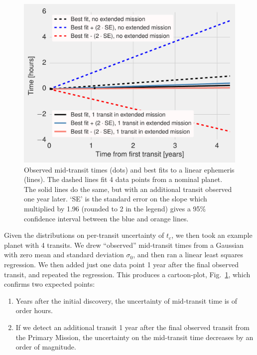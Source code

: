 \begin{figure}[!t]
	\centering
	\includegraphics[scale=1.]{figures/lowering_uncertainty_on_midtransit_via_extra_point.pdf}
	\caption{	Observed mid-transit times (dots) and best fits to a linear ephemeris (lines).
		The dashed lines fit 4 data points from a nominal planet.
		The solid lines do the same, but with an additional transit observed one year
		later.
		`SE' is the standard error on the slope which multiplied by 1.96 (rounded to 2 in the legend) gives a 95\% confidence interval between the blue and orange lines.
	}
	\label{fig:lowering_uncertainty_tc}
\end{figure}

Given the distributions on per-transit uncertainty of $t_c$, we then took an example planet with 4 transits.
We drew ``observed'' mid-transit times from a Gaussian with zero mean and standard deviation $\sigma_{0}$, and then ran a linear least squares regression. 
We then added just one data point 1 year after the final observed transit, and repeated the regression.
This produces a cartoon-plot, Fig.~\ref{fig:lowering_uncertainty_tc}, which confirms two expected points:
\begin{enumerate}
	\item Years after the initial discovery, the uncertainty of mid-transit time is of order hours.
	\item If we detect an additional transit 1 year after the final observed transit from the Primary Mission, the uncertainty on the mid-transit time decreases by an order of magnitude.
\end{enumerate}

